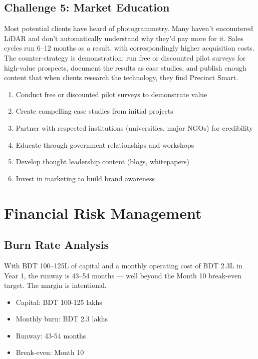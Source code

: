 \subsection{Challenge 5: Market Education}

Most potential clients have heard of photogrammetry. Many haven't encountered LiDAR and don't automatically understand why they'd pay more for it. Sales cycles run 6--12 months as a result, with correspondingly higher acquisition costs. The counter-strategy is demonstration: run free or discounted pilot surveys for high-value prospects, document the results as case studies, and publish enough content that when clients research the technology, they find Precinct Smart.

\begin{enumerate}
    \item Conduct free or discounted pilot surveys to demonstrate value
    \item Create compelling case studies from initial projects
    \item Partner with respected institutions (universities, major NGOs) for credibility
    \item Educate through government relationships and workshops
    \item Develop thought leadership content (blogs, whitepapers)
    \item Invest in marketing to build brand awareness
\end{enumerate}

\section{Financial Risk Management}

\subsection{Burn Rate Analysis}

With BDT 100--125L of capital and a monthly operating cost of BDT 2.3L in Year 1, the runway is 43--54 months --- well beyond the Month 10 break-even target. The margin is intentional.

\begin{itemize}
    \item Capital: BDT 100-125 lakhs
    \item Monthly burn: BDT 2.3 lakhs
    \item Runway: 43-54 months
    \item Break-even: Month 10
\end{itemize}

